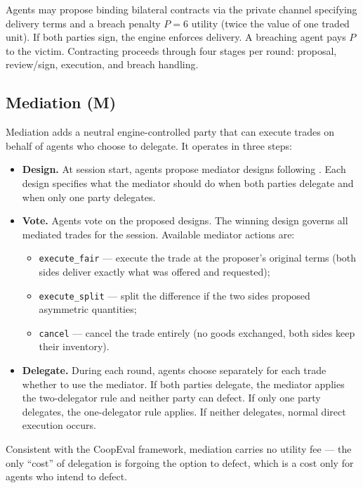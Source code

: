 \documentclass{article}
\begin{document}
Agents may propose binding bilateral contracts via the private channel specifying delivery terms and a breach penalty $P = 6$ utility (twice the value of one traded unit). If both parties sign, the engine enforces delivery. A breaching agent pays $P$ to the victim. Contracting proceeds through four stages per round: proposal, review/sign, execution, and breach handling.

\subsection{Mediation (M)}

Mediation adds a neutral engine-controlled party that can execute trades on behalf of agents who choose to delegate. It operates in three steps:

\begin{itemize}
  \item \textbf{Design.} At session start, agents propose mediator designs following \citet{coopeval}. Each design specifies what the mediator should do when both parties delegate and when only one party delegates.
  \item \textbf{Vote.} Agents vote on the proposed designs. The winning design governs all mediated trades for the session. Available mediator actions are:
  \begin{itemize}
    \item \texttt{execute\_fair} --- execute the trade at the proposer's original terms (both sides deliver exactly what was offered and requested);
    \item \texttt{execute\_split} --- split the difference if the two sides proposed asymmetric quantities;
    \item \texttt{cancel} --- cancel the trade entirely (no goods exchanged, both sides keep their inventory).
  \end{itemize}
  \item \textbf{Delegate.} During each round, agents choose separately for each trade whether to use the mediator. If both parties delegate, the mediator applies the two-delegator rule and neither party can defect. If only one party delegates, the one-delegator rule applies. If neither delegates, normal direct execution occurs.
\end{itemize}

Consistent with the CoopEval framework, mediation carries no utility fee --- the only ``cost'' of delegation is forgoing the option to defect, which is a cost only for agents who intend to defect.
\end{document}
